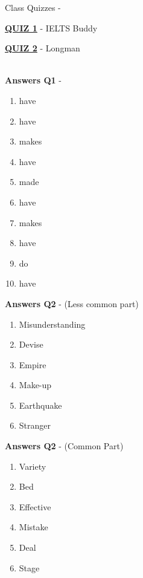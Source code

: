 \documentclass[a4paper,30pt]{report}
\begin{document}
      Class Quizzes - \\
      \par \href{https://www.ieltsbuddy.com/collocation-quiz.html?authuser=1}{\textbf{QUIZ 1}} - IELTS Buddy
      \par \href{https://www.ldoceonline.com/quiz/section-collocations/?authuser=1}{\textbf{QUIZ 2}} - Longman\\\\


      \par \textbf{Answers Q1} -  
      \begin{enumerate} 
        \item have 
        \item have 
        \item makes
        \item have 
        \item made 
        \item have 
        \item makes
        \item have 
        \item do 
        \item have 
      \end{enumerate}

      \newpage 

      \par \textbf{Answers Q2} -  (Less common part)
      \begin{enumerate}
        \item Misunderstanding
        \item Devise
        \item Empire 
        \item Make-up
        \item Earthquake
        \item Stranger
      \end{enumerate}

      \par \textbf{Answers Q2} - (Common Part)
      \begin{enumerate}
        \item Variety 
        \item Bed 
        \item Effective 
        \item Mistake 
        \item Deal
        \item Stage
      \end{enumerate}
\end{document}
